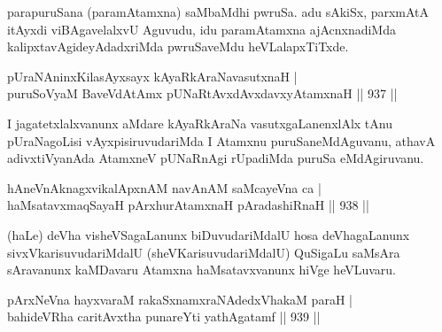 \begin{artha}
parapuruSana (paramAtamxna) saMbaMdhi pwruSa. adu sAkiSx, parxmAtA itAyxdi viBAgavelalxvU Aguvudu, idu paramAtamxna ajAcnxnadiMda kalipxtavAgideyAdadxriMda pwruSaveMdu heVLalapxTiTxde.
\end{artha}


\begin{shl}
pUraNAninxKilasAyxsayx kAyaRkAraNavasutxnaH | \\
puruSoV\s yaM BaveVdAtAmx pUNaRtAvxdAvx\s davxyAtamxnaH \hfill||  937 ||  
\end{shl}

\begin{artha}
I jagatetxlalxvanunx aMdare kAyaRkAraNa vasutxgaLanenxlAlx tAnu pUraNagoLisi vAyxpisiruvudariMda I Atamxnu puruSaneMdAguvanu, athavA adivxtiVyanAda AtamxneV pUNaRnAgi rUpadiMda puruSa eMdAgiruvanu.
\end{artha}


\begin{shl}
hAneVnAknagx\footnotemark[1]vikalApxnAM navAnAM saMcayeVna ca | \\
haMsatavxmaqSayaH pArxhurAtamxnaH pAradashiRnaH \hfill||  938 ||  
\end{shl}

\begin{artha}
(haLe) deVha visheVSagaLanunx biDuvudariMdalU hosa deVhagaLanunx sivxVkarisuvudariMdalU (sheVKarisuvudariMdalU) QuSigaLu saMsAra sAravanunx kaMDavaru Atamxna haMsatavxvanunx hiVge heVLuvaru.
\end{artha}


\begin{shl}
pArxNeVna hayxvaraM rakaSxnamxraNAdedxVhakaM paraH | \\
bahideVRha caritAvx\s tha punareYti yathAgatamf \hfill||  939 ||  
\end{shl}

